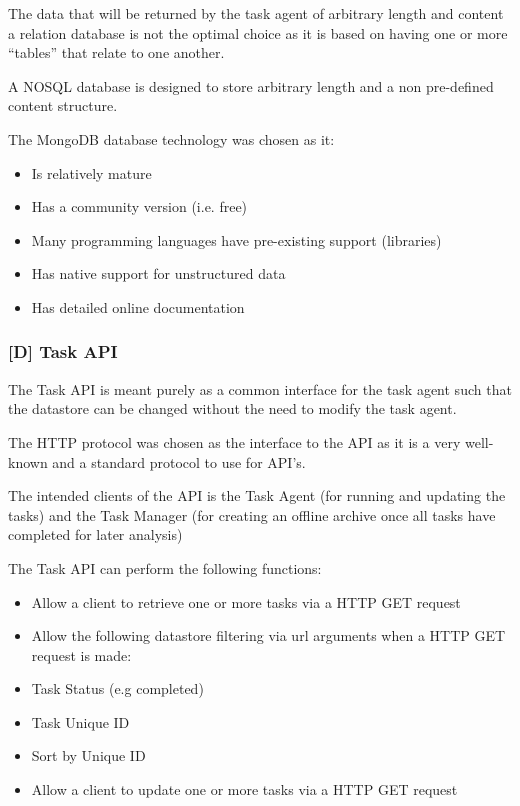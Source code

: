 \documentclass{mscreport}
\begin{document}
\vspace{0.3cm} \noindent
The data that will be returned by the task agent of arbitrary length and content a relation database is not the optimal choice as it is based on having one or more “tables” that relate to one another.

\vspace{0.3cm} \noindent
A NOSQL database is designed to store arbitrary length and a non pre-defined content structure.

\vspace{0.3cm} \noindent
The MongoDB database technology was chosen as it:

\begin{itemize}
	\setlength\itemsep{0.1em}
    \item Is relatively mature
    \item Has a community version (i.e. free)
    \item Many programming languages have pre-existing support (libraries)
    \item Has native support for unstructured data
    \item Has detailed online documentation
\end{itemize}

\subsubsection{[D] Task API}

The Task API is meant purely as a common interface for the task agent such that the datastore can be changed without the need to modify the task agent.

\vspace{0.3cm} \noindent
The HTTP protocol was chosen as the interface to the API as it is a very well-known and a standard protocol to use for API’s.

\vspace{0.3cm} \noindent
The intended clients of the API is the Task Agent (for running and updating the tasks) and the Task Manager (for creating an offline archive once all tasks have completed for later analysis)

\vspace{0.3cm} \noindent
The Task API can perform the following functions:

\begin{itemize}
	\setlength\itemsep{0.1em}
    \item Allow a client to retrieve one or more tasks via a HTTP GET request
    \item Allow the following datastore filtering via url arguments when a HTTP GET request is made:
    \item Task Status (e.g completed)
    \item Task Unique ID
    \item Sort by Unique ID
    \item Allow a client to update one or more tasks via a HTTP GET request
\end{itemize}
\end{document}
